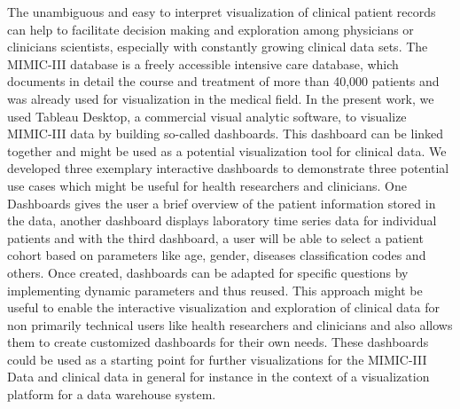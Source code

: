 The unambiguous and easy to interpret visualization of clinical patient records can help to facilitate decision making and exploration among physicians or clinicians scientists, especially with constantly growing clinical data sets. The MIMIC-III database is a freely accessible intensive care database, which documents in detail the course and treatment of more than 40,000 patients and was already used for visualization in the medical field. In the present work, we used Tableau Desktop, a commercial visual analytic software, to visualize MIMIC-III data by building so-called dashboards. This dashboard can be linked together and might be used as a potential visualization tool for clinical data. We developed three exemplary interactive dashboards to demonstrate three potential use cases which might be useful for health researchers and clinicians. One Dashboards gives the user a brief overview of the patient information stored in the data, another dashboard displays laboratory time series data for individual patients and with the third dashboard, a user will be able to select a patient cohort based on parameters like age, gender, diseases classification codes and others. Once created, dashboards can be adapted for specific questions by implementing dynamic parameters and thus reused. This approach might be useful to enable the interactive visualization and exploration of clinical data for non primarily technical users like health researchers and clinicians and also allows them to create customized dashboards for their own needs. These dashboards could be used as a starting point for further visualizations for the MIMIC-III Data and clinical data in general for instance in the context of a visualization platform for a data warehouse system. 